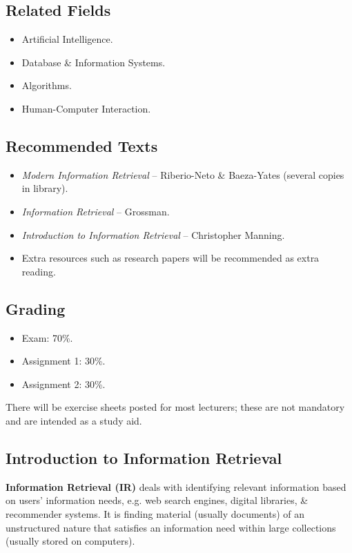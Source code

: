 \documentclass[a4paper,11pt]{article}
\begin{document}
\subsection{Related Fields}
\begin{itemize}
    \item   Artificial Intelligence.
    \item   Database \& Information Systems.
    \item   Algorithms.
    \item   Human-Computer Interaction.
\end{itemize}

\subsection{Recommended Texts}
\begin{itemize}
    \item   \textit{Modern Information Retrieval} -- Riberio-Neto \& Baeza-Yates (several copies in library).
    \item   \textit{Information Retrieval} -- Grossman.
    \item   \textit{Introduction to Information Retrieval} -- Christopher Manning.
    \item   Extra resources such as research papers will be recommended as extra reading.
\end{itemize}

\subsection{Grading}
\begin{itemize}
    \item   Exam: 70\%.
    \item   Assignment 1: 30\%.
    \item   Assignment 2: 30\%.
\end{itemize}

There will be exercise sheets posted for most lecturers; these are not mandatory and are intended as a study aid.

\subsection{Introduction to Information Retrieval}
\textbf{Information Retrieval (IR)} deals with identifying relevant information based on users' information needs, e.g.
web search engines, digital libraries, \& recommender systems. 
It is finding material (usually documents) of an unstructured nature that satisfies an information need within large
collections (usually stored on computers).
\end{document}
